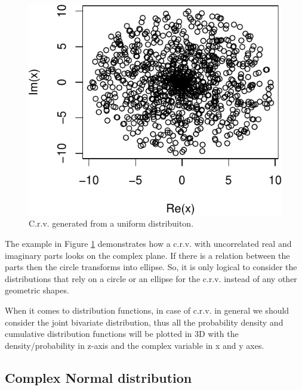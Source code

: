 \documentclass[
]{book}
\begin{document}
\begin{figure}
\centering
\includegraphics{Svetunkov---Svetunkov---Complex-Dynamic-Models_files/figure-latex/crvGeneratedCircle-1.pdf}
\caption{\label{fig:crvGeneratedCircle}C.r.v. generated from a uniform distribuiton.}
\end{figure}

The example in Figure \ref{fig:crvGeneratedCircle} demonstrates how a c.r.v. with uncorrelated real and imaginary parts looks on the complex plane. If there is a relation between the parts then the circle transforms into ellipse. So, it is only logical to consider the distributions that rely on a circle or an ellipse for the c.r.v. instead of any other geometric shapes.

When it comes to distribution functions, in case of c.r.v. in general we should consider the joint bivariate distribution, thus all the probability density and cumulative distribution functions will be plotted in 3D with the density/probability in z-axis and the complex variable in x and y axes.

\hypertarget{distributionCNorm}{%
\subsection{Complex Normal distribution}\label{distributionCNorm}}
\end{document}
